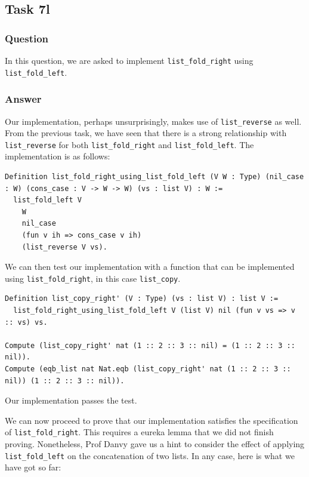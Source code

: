 \documentclass{article}
\begin{document}
\subsection{Task 7l}

\subsubsection{Question}
In this question, we are asked to implement \texttt{list\_fold\_right} using \texttt{list\_fold\_left}.

\subsubsection{Answer}

Our implementation, perhaps unsurprisingly, makes use of \texttt{list\_reverse} as well. From the previous task, we have seen that there is a strong relationship with \texttt{list\_reverse} for both \texttt{list\_fold\_right} and \texttt{list\_fold\_left}. The implementation is as follows:

\begin{lstlisting}
Definition list_fold_right_using_list_fold_left (V W : Type) (nil_case : W) (cons_case : V -> W -> W) (vs : list V) : W :=
  list_fold_left V
    W
    nil_case
    (fun v ih => cons_case v ih)
    (list_reverse V vs).
\end{lstlisting}

We can then test our implementation with a function that can be implemented using \texttt{list\_fold\_right}, in this case \texttt{list\_copy}.

\begin{lstlisting}
Definition list_copy_right' (V : Type) (vs : list V) : list V :=
  list_fold_right_using_list_fold_left V (list V) nil (fun v vs => v :: vs) vs.

Compute (list_copy_right' nat (1 :: 2 :: 3 :: nil) = (1 :: 2 :: 3 :: nil)).
Compute (eqb_list nat Nat.eqb (list_copy_right' nat (1 :: 2 :: 3 :: nil)) (1 :: 2 :: 3 :: nil)).
\end{lstlisting}

Our implementation passes the test.

We can now proceed to prove that our implementation satisfies the specification of \texttt{list\_fold\_right}. This requires a eureka lemma that we did not finish proving. Nonetheless, Prof Danvy gave us a hint to consider the effect of applying \texttt{list\_fold\_left} on the concatenation of two lists. In any case, here is what we have got so far:
\end{document}
